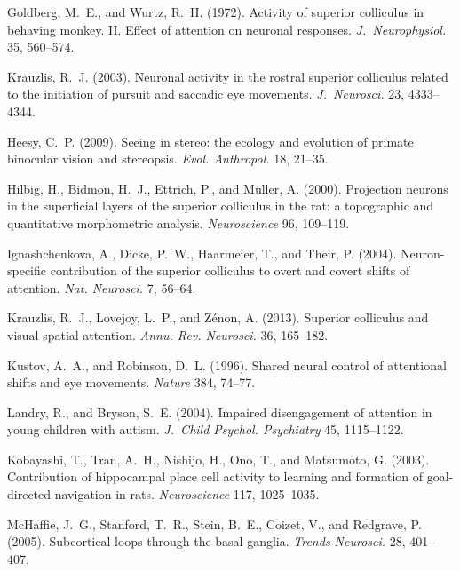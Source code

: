 \begin{thebibliography}{}
 Goldberg, M.~E.,
and Wurtz, R.~H.  (1972). Activity of superior colliculus in behaving
monkey. II. Effect of attention on neuronal responses.
\textit{J.~Neurophysiol.} 35, \hbox{560--574}.

 Krauzlis, R.~J.  (2003).
Neuronal activity in the rostral superior colliculus related to the
initiation of pursuit and saccadic eye movements.
\textit{J.~Neurosci.} 23, 4333--4344.

Heesy, C.~P.  (2009). Seeing
in stereo: the ecology and evolution of primate binocular vision and
stereopsis. \textit{Evol. Anthropol.} 18, 21--35.

 Hilbig, H., Bidmon,
H.~J., Ettrich, P., and M\"{u}ller, A.  (2000). Projection neurons in
the superficial layers of the superior colliculus in the rat: a
topographic and quantitative morphometric analysis.
\textit{Neuroscience} 96, 109--119.

Ignashchenkova, A., Dicke, P.~W., Haarmeier, T., and Their, P.
(2004). Neuron-specific contribution of the superior colliculus to
overt and covert shifts of attention. \textit{Nat. Neurosci.} 7,
56--64.

 Krauzlis, R.~J.,
Lovejoy, L.~P., and Z\'{e}non, A.  (2013). Superior colliculus and
visual spatial attention. \textit{Annu. Rev. Neurosci.} 36, 165--182.

 Kustov, A.~A.,
and Robinson, D.~L.  (1996). Shared neural control of attentional
shifts and eye movements. \textit{Nature} 384, 74--77.

 Landry, R., and
Bryson, S.~E.  (2004). Impaired disengagement of attention in young
children with autism. \textit{J.~Child Psychol. Psychiatry} 45,
1115--1122.

 Kobayashi, T.,
Tran, A.~H., Nishijo, H., Ono, T., and Matsumoto, G.  (2003).
Contribution of hippocampal place cell activity to learning and
formation of goal-directed navigation in rats. \textit{Neuroscience}
117, 1025--1035.

 McHaffie, J.~G.,
Stanford, T.~R., Stein, B.~E., Coizet, V., and Redgrave, P.  (2005).
Subcortical loops through the basal ganglia. \textit{Trends Neurosci.}
28, 401--407.


\end{thebibliography}
